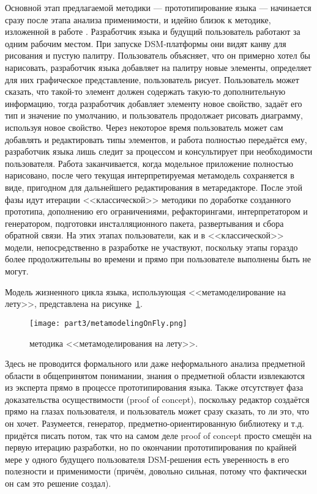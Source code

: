 Основной этап предлагаемой методики --- прототипирование языка --- начинается сразу 
после этапа анализа применимости, и идейно близок к методике, изложенной в работе 
\cite{repenning1995agentsheets}. Разработчик языка и будущий пользователь работают 
за одним рабочим местом. При запуске DSM-платформы они видят канву для рисования и 
пустую палитру. Пользователь объясняет, что он примерно хотел бы нарисовать, разработчик 
языка добавляет на палитру новые элементы, определяет для них графическое представление, 
пользователь рисует. Пользователь может сказать, что такой-то элемент должен содержать 
такую-то дополнительную информацию, тогда разработчик добавляет элементу новое свойство, 
задаёт его тип и значение по умолчанию, и пользователь продолжает рисовать диаграмму, 
используя новое свойство. Через некоторое время пользователь может сам добавлять и 
редактировать типы элементов, и работа полностью передаётся ему, разработчик языка 
лишь следит за процессом и консультирует при необходимости пользователя. Работа заканчивается, 
когда модельное приложение полностью нарисовано, после чего текущая интерпретируемая 
метамодель сохраняется в виде, пригодном для дальнейшего редактирования в метаредакторе. 
После этой фазы идут итерации <<классической>> методики по доработке созданного 
прототипа, дополнению его ограничениями, рефакторингами, интерпретатором и генератором, 
подготовки инсталляционного пакета, развертывания и сбора обратной связи. На этих этапах 
пользователи, как и в <<классической>> модели, непосредственно в разработке не участвуют, 
поскольку этапы гораздо более продолжительны во времени и прямо при пользователе выполнены 
быть не могут.

Модель жизненного цикла языка, использующая <<метамоделирование на лету>>, представлена 
на рисунке~\ref{metamodelingOnFly}.

\begin{figure} [ht]
	\begin{center}
		\texttt{[image: part3/metamodelingOnFly.png]}
		\caption{методика <<метамоделирования на лету>>.}
		\label{metamodelingOnFly}
	\end{center}
\end{figure}

Здесь не проводится формального или даже неформального анализа предметной области в 
общепринятом понимании, знания о предметной области извлекаются из эксперта прямо 
в процессе прототипирования языка. Также отсутствует фаза доказательства осуществимости 
(proof of concept), поскольку редактор создаётся прямо на глазах пользователя, и пользователь 
может сразу сказать, то ли это, что он хочет. Разумеется, генератор, предметно-ориентированную 
библиотеку и т.д. придётся писать потом, так что на самом деле proof of concept просто 
смещён на первую итерацию разработки, но по окончании прототипирования по крайней мере 
у одного будущего пользователя DSM-решения есть уверенность в его полезности и применимости 
(причём, довольно сильная, потому что фактически он сам это решение создал).

